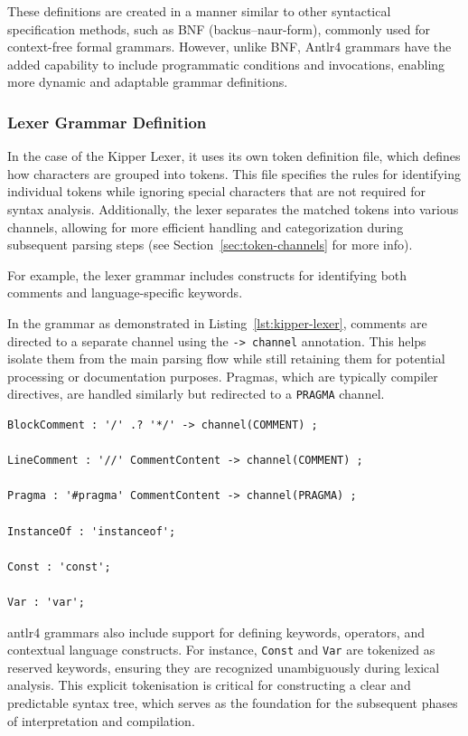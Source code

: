 These definitions are created in a manner similar to other syntactical specification methods, such as BNF (\Gls{backus–naur-form}), commonly used for context-free formal grammars. However, unlike BNF, Antlr4 grammars have the added capability to include programmatic conditions and invocations, enabling more dynamic and adaptable grammar definitions.

\subsubsection{Lexer Grammar Definition}
\label{sec:lexer-grammar-definition}

In the case of the Kipper Lexer, it uses its own token definition file, which defines how characters are grouped into tokens. This file specifies the rules for identifying individual tokens while ignoring special characters that are not required for syntax analysis. Additionally, the lexer separates the matched tokens into various channels, allowing for more efficient handling and categorization during subsequent parsing steps (see Section~\ref{sec:token-channels} for more info).

For example, the lexer grammar includes constructs for identifying both comments and language-specific keywords.

In the grammar as demonstrated in Listing~\ref{lst:kipper-lexer}, comments are directed to a separate channel using the \lstinline|-> channel| annotation. This helps isolate them from the main parsing flow while still retaining them for potential processing or documentation purposes. Pragmas, which are typically compiler directives, are handled similarly but redirected to a \lstinline|PRAGMA| channel.

\begin{lstlisting}[language=antlr4, caption={Sample snippet from the Kipper Lexer grammar}, label={lst:kipper-lexer}]
BlockComment : '/' .? '*/' -> channel(COMMENT) ;

LineComment : '//' CommentContent -> channel(COMMENT) ;

Pragma : '#pragma' CommentContent -> channel(PRAGMA) ;

InstanceOf : 'instanceof';

Const : 'const';

Var : 'var';
\end{lstlisting}

\Gls{antlr4} grammars also include support for defining keywords, operators, and contextual language constructs. For instance, \lstinline|Const| and \lstinline|Var| are tokenized as reserved keywords, ensuring they are recognized unambiguously during lexical analysis. This explicit tokenisation is critical for constructing a clear and predictable syntax tree, which serves as the foundation for the subsequent phases of interpretation and compilation.

